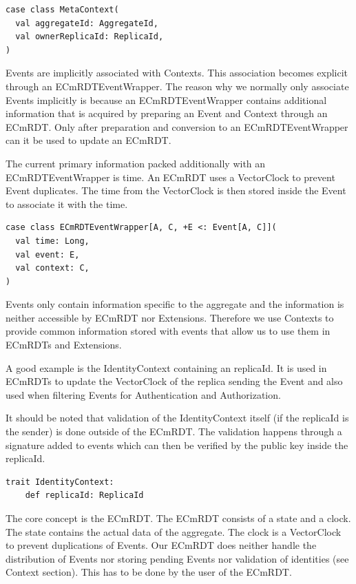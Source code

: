 \documentclass[
	ngerman,
	ruledheaders=section,   %
	class=report,		    %
	thesis={type=bachelor}, %
	accentcolor=9c,			%
	custommargins=true,    %
	marginpar=false,        %
	parskip=half-,          %
	fontsize=11pt,          %
]{tudapub}
\begin{document}
\begin{lstlisting}
case class MetaContext(
  val aggregateId: AggregateId,
  val ownerReplicaId: ReplicaId,
)
\end{lstlisting}

Events are implicitly associated with Contexts. This association becomes explicit through an ECmRDTEventWrapper. The reason why we normally only associate Events implicitly is because an ECmRDTEventWrapper contains additional information that is acquired by preparing an Event and Context through an ECmRDT. Only after preparation and conversion to an ECmRDTEventWrapper can it be used to update an ECmRDT. 

The current primary information packed additionally with an ECmRDTEventWrapper is time. An ECmRDT uses a VectorClock to prevent Event duplicates. The time from the VectorClock is then stored inside the Event to associate it with the time.

\begin{lstlisting}
case class ECmRDTEventWrapper[A, C, +E <: Event[A, C]](
  val time: Long,
  val event: E,
  val context: C,
)
\end{lstlisting}

Events only contain information specific to the aggregate and the information is neither accessible by ECmRDT nor Extensions. Therefore we use Contexts to provide common information stored with events that allow us to use them in ECmRDTs and Extensions. 

A good example is the IdentityContext containing an replicaId. It is used in ECmRDTs to update the VectorClock of the replica sending the Event and also used when filtering Events for Authentication and Authorization.

It should be noted that validation of the IdentityContext itself (if the replicaId is the sender) is done outside of the ECmRDT. The validation happens through a signature added to events which can then be verified by the public key inside the replicaId.

\begin{lstlisting}
trait IdentityContext:
	def replicaId: ReplicaId
\end{lstlisting}

The core concept is the ECmRDT. The ECmRDT consists of a state and a clock. The state contains the actual data of the aggregate. The clock is a VectorClock to prevent duplications of Events. Our ECmRDT does neither handle the distribution of Events nor storing pending Events nor validation of identities (see Context section). This has to be done by the user of the ECmRDT.
\end{document}
